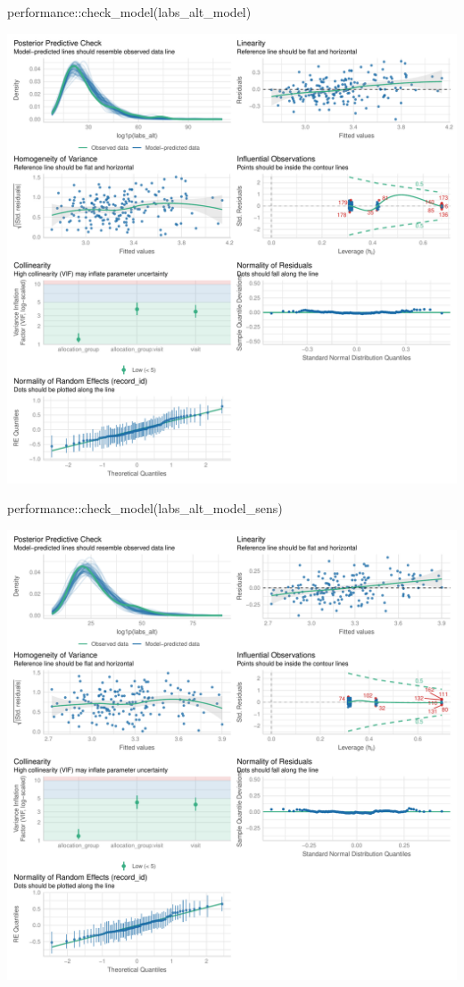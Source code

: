 \documentclass[
  letterpaper,
  DIV=11,
  numbers=noendperiod]{scrartcl}
\newenvironment{Shaded}{\begin{snugshade}}{\end{snugshade}}
\newcommand{\FunctionTok}[1]{\textcolor[rgb]{0.28,0.35,0.67}{#1}}
\newcommand{\NormalTok}[1]{\textcolor[rgb]{0.00,0.23,0.31}{#1}}
\newcommand{\SpecialCharTok}[1]{\textcolor[rgb]{0.37,0.37,0.37}{#1}}
\begin{document}
\begin{Shaded}
\begin{Highlighting}[]
\NormalTok{performance}\SpecialCharTok{::}\FunctionTok{check\_model}\NormalTok{(labs\_alt\_model)}
\end{Highlighting}
\end{Shaded}

\includegraphics{Outcomes_V1V2V3_files/figure-pdf/labs_alt_4-1.pdf}

\begin{Shaded}
\begin{Highlighting}[]
\NormalTok{performance}\SpecialCharTok{::}\FunctionTok{check\_model}\NormalTok{(labs\_alt\_model\_sens)}
\end{Highlighting}
\end{Shaded}

\includegraphics{Outcomes_V1V2V3_files/figure-pdf/labs_alt_4-2.pdf}
\end{document}
